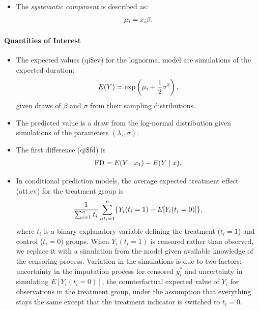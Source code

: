 \documentclass[letterpaper,10pt,english]{sphinxmanual}
\begin{document}
\begin{itemize}
\item {} 
The \emph{systematic component} is described as:
\begin{gather}
\begin{split}\mu_i = x_i \beta .\end{split}\notag
\end{gather}
\end{itemize}


\paragraph{Quantities of Interest}
\label{zelig-lognorm:quantities-of-interest}\begin{itemize}
\item {} 
The expected values (qi\$ev) for the lognormal model are simulations
of the expected duration:
\begin{gather}
\begin{split}E(Y) =  \exp\left(\mu_i + \frac{1}{2}\sigma^2 \right),\end{split}\notag
\end{gather}
given draws of \(\beta\) and \(\sigma\) from their sampling
distributions.

\item {} 
The predicted value is a draw from the log-normal distribution given
simulations of the parameters \((\lambda_i, \sigma)\).

\item {} 
The first difference (qi\$fd) is
\begin{gather}
\begin{split}\textrm{FD} = E(Y \mid x_1) - E(Y \mid x).\end{split}\notag
\end{gather}
\item {} 
In conditional prediction models, the average expected treatment
effect (att.ev) for the treatment group is
\begin{gather}
\begin{split}\frac{1}{\sum_{i=1}^n t_i}\sum_{i:t_i=1}^n \{ Y_i(t_i=1) - E[Y_i(t_i=0)] \},\end{split}\notag
\end{gather}
where \(t_i\) is a binary explanatory variable defining the
treatment (\(t_i=1\)) and control (\(t_i=0\)) groups. When
\(Y_i(t_i=1)\) is censored rather than observed, we replace it
with a simulation from the model given available knowledge of the
censoring process. Variation in the simulations is due to two
factors: uncertainty in the imputation process for censored
\(y_i^*\) and uncertainty in simulating \(E[Y_i(t_i=0)]\),
the counterfactual expected value of \(Y_i\) for observations in
the treatment group, under the assumption that everything stays the
same except that the treatment indicator is switched to
\(t_i=0\).


\end{itemize}
\end{document}
